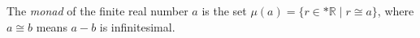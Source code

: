 The \emph{monad} of the finite real number $a$ is the set $\mu(a) = \{r \in *\mathbb{R} \mid r \cong a\}$, where $a \cong b$ means $a - b$ is infinitesimal.
